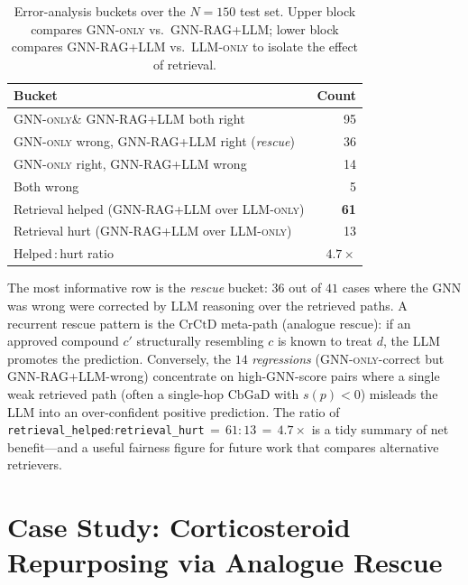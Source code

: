 \documentclass{article}
\newcommand{\ours}{\textsc{GNN-RAG+LLM}\xspace}
\newcommand{\gnno}{\textsc{GNN-only}\xspace}
\newcommand{\llmo}{\textsc{LLM-only}\xspace}
\begin{document}
\begin{table}[t]
\centering
\small
\caption{Error-analysis buckets over the $N{=}150$ test set. Upper block compares \gnno vs.\ \ours; lower block compares \ours vs.\ \llmo to isolate the effect of retrieval.}
\label{tab:buckets}
\begin{tabular}{@{}lr@{}}
\toprule
Bucket & Count \\
\midrule
\gnno \& \ours both right                  & 95 \\
\gnno wrong, \ours right (\emph{rescue})   & 36 \\
\gnno right, \ours wrong                   & 14 \\
Both wrong                                 & 5  \\
\midrule
Retrieval helped (\ours over \llmo)        & \textbf{61} \\
Retrieval hurt   (\ours over \llmo)        & 13 \\
Helped\,:\,hurt ratio                      & $4.7\times$ \\
\bottomrule
\end{tabular}
\end{table}

The most informative row is the \emph{rescue} bucket: $36$ out of $41$ cases where the GNN was wrong were corrected by LLM reasoning over the retrieved paths. A recurrent rescue pattern is the $\text{CrCtD}$ meta-path (analogue rescue): if an approved compound $c'$ structurally resembling $c$ is known to treat $d$, the LLM promotes the prediction. Conversely, the $14$ \emph{regressions} (\gnno-correct but \ours-wrong) concentrate on high-GNN-score pairs where a single weak retrieved path (often a single-hop $\text{CbGaD}$ with $s(p){<}0$) misleads the LLM into an over-confident positive prediction. The ratio of \texttt{retrieval\_helped}:\texttt{retrieval\_hurt}$\,=\,61{:}13\,=\,4.7{\times}$ is a tidy summary of net benefit---and a useful fairness figure for future work that compares alternative retrievers.

\section{Case Study: Corticosteroid Repurposing via Analogue Rescue}
\label{sec:case}
\end{document}
